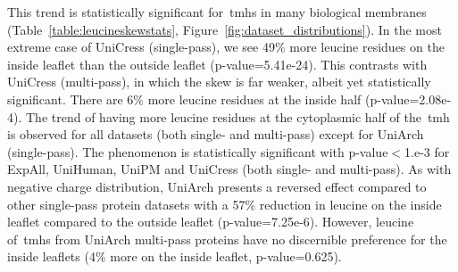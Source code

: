 This trend is statistically significant for~\gls{tmh}s in many biological membranes (Table~\ref{table:leucineskewstats}, Figure~\ref{fig:dataset_distributions}).
In the most extreme case of UniCress (single\--pass), we see 49\% more leucine residues on the inside leaflet than the outside leaflet (p\--value=5.41e-24).
This contrasts with UniCress (multi\--pass), in which the skew is far weaker, albeit yet statistically significant.
There are 6\% more leucine residues at the inside half (p\--value=2.08e-4).
The trend of having more leucine residues at the cytoplasmic half of the~\gls{tmh} is observed for all datasets (both single- and multi\--pass) except for UniArch (single\--pass).
The phenomenon is statistically significant with p\--value$<$1.e-3 for ExpAll, UniHuman, UniPM and UniCress (both single- and multi\--pass).
As with negative charge distribution, UniArch presents a reversed effect compared to other single\--pass protein datasets with a 57\% reduction in leucine on the inside leaflet compared to the outside leaflet (p\--value=7.25e-6).
However, leucine of~\gls{tmh}s from UniArch multi\--pass proteins have no discernible preference for the inside leaflets (4\% more on the inside leaflet, p\--value=0.625).

